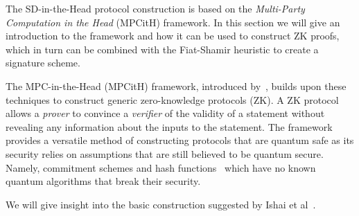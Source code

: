 \documentclass[twoside,11pt]{report}
\theoremstyle{definition}
\theoremstyle{plain}
\begin{document}
The SD-in-the-Head protocol construction is based on the \textit{Multi-Party Computation in the Head} (MPCitH) framework. In this section we will give an introduction to the framework and how it can be used to construct ZK proofs, which in turn can be combined with the Fiat-Shamir heuristic to create a signature scheme.

The MPC-in-the-Head (MPCitH) framework, introduced by~\cite{ishai2007zero}, builds upon these techniques to construct generic zero-knowledge protocols (ZK). A ZK protocol allows a \textit{prover} to convince a \textit{verifier} of the validity of a statement without revealing any information about the inputs to the statement. The framework provides a versatile method of constructing protocols that are quantum safe as its security relies on assumptions that are still believed to be quantum secure. Namely, commitment schemes and hash functions~\cite{feneuil2023threshold} which have no known quantum algorithms that break their security.

We will give insight into the basic construction suggested by Ishai et al~\cite{ishai2007zero}.
\end{document}
